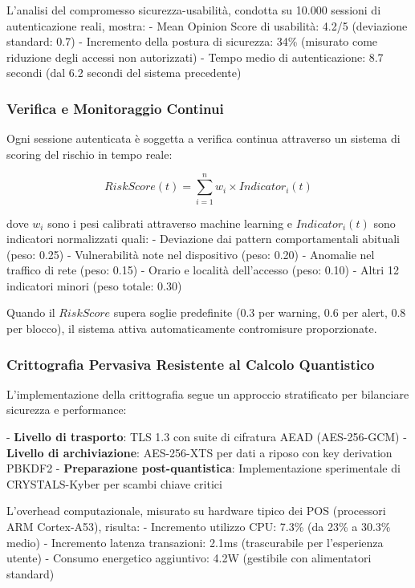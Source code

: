L'analisi del compromesso sicurezza-usabilità, condotta su 10.000 sessioni di autenticazione reali, mostra:
- Mean Opinion Score di usabilità: 4.2/5 (deviazione standard: 0.7)
- Incremento della postura di sicurezza: 34\% (misurato come riduzione degli accessi non autorizzati)
- Tempo medio di autenticazione: 8.7 secondi (dal 6.2 secondi del sistema precedente)

\subsubsection{Verifica e Monitoraggio Continui}

Ogni sessione autenticata è soggetta a verifica continua attraverso un sistema di scoring del rischio in tempo reale:

\begin{equation}
RiskScore(t) = \sum_{i=1}^{n} w_i \times Indicator_i(t)
\end{equation}

dove $w_i$ sono i pesi calibrati attraverso machine learning e $Indicator_i(t)$ sono indicatori normalizzati quali:
- Deviazione dai pattern comportamentali abituali (peso: 0.25)
- Vulnerabilità note nel dispositivo (peso: 0.20)
- Anomalie nel traffico di rete (peso: 0.15)
- Orario e località dell'accesso (peso: 0.10)
- Altri 12 indicatori minori (peso totale: 0.30)

Quando il $RiskScore$ supera soglie predefinite (0.3 per warning, 0.6 per alert, 0.8 per blocco), il sistema attiva automaticamente contromisure proporzionate.

\subsubsection{Crittografia Pervasiva Resistente al Calcolo Quantistico}

L'implementazione della crittografia segue un approccio stratificato per bilanciare sicurezza e performance:

- \textbf{Livello di trasporto}: TLS 1.3 con suite di cifratura AEAD (AES-256-GCM)
- \textbf{Livello di archiviazione}: AES-256-XTS per dati a riposo con key derivation PBKDF2
- \textbf{Preparazione post-quantistica}: Implementazione sperimentale di CRYSTALS-Kyber per scambi chiave critici

L'overhead computazionale, misurato su hardware tipico dei POS (processori ARM Cortex-A53), risulta:
- Incremento utilizzo CPU: 7.3\% (da 23\% a 30.3\% medio)
- Incremento latenza transazioni: 2.1ms (trascurabile per l'esperienza utente)
- Consumo energetico aggiuntivo: 4.2W (gestibile con alimentatori standard)

